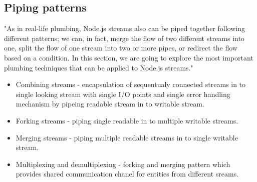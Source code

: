 \subsection{Piping patterns}
"As in real-life plumbing, Node.js streams also can be piped together following different patterns; we can, in fact, merge the flow of two different streams into one, split the flow of one stream into two or more pipes, or redirect the flow based on a condition. 
In this section, we are going to explore the most important plumbing techniques that can be applied to Node.js streams."\cite{nodejsbook}
\begin{itemize}
	\item Combining streams - encapsulation of sequentualy connected streams in to single looking stream with single I/O points and single error handling mechanism by pipeing readable stream in to writable stream.\cite{nodejsbook}
	\item Forking streams - piping single readable in to multiple writable streams.\cite{nodejsbook}
	\item Merging streams - piping multiple readable streams in to single writable stream.\cite{nodejsbook}
	\item Multiplexing and demultiplexing - forking and merging pattern which provides shared communication chanel for entities from different sreams.\cite{nodejsbook}
\end{itemize}
